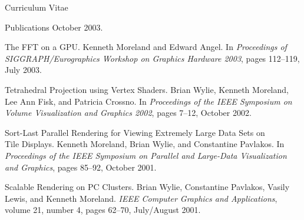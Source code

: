 \documentclass{article}
\begin{document}
\begin{cv}{Curriculum Vitae}
\begin{cvlist}{Publications}
      October 2003.
    \item[The FFT on a GPU.] Kenneth Moreland and Edward Angel.  In
      \emph{Proceedings of SIGGRAPH/Eurographics Workshop on Graphics
        Hardware 2003}, pages 112--119, July 2003.
    \item[Tetrahedral Projection using Vertex Shaders.] Brian Wylie,
      Kenneth Moreland, Lee Ann Fisk, and Patricia Crossno.  In
      \emph{Proceedings of the IEEE Symposium on Volume Visualization and
        Graphics 2002}, pages 7--12, October 2002.
    \item[Sort-Last Parallel Rendering for Viewing Extremely Large Data
      Sets on]~\\ Tile Displays. Kenneth Moreland, Brian Wylie, and
      Constantine Pavlakos.  In \emph{Proceedings of the IEEE Symposium on
        Parallel and Large-Data Visualization and Graphics}, pages 85--92,
      October 2001.
    \item[Scalable Rendering on PC Clusters.] Brian Wylie, Constantine
      Pavlakos, Vasily Lewis, and Kenneth Moreland.  \emph{IEEE Computer
        Graphics and Applications}, volume 21, number 4, pages 62--70,
      July/August 2001.
    \end{cvlist}


\end{cv}
\end{document}
